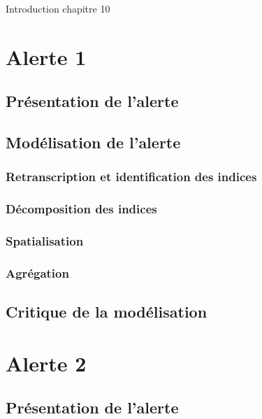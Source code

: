 \chaptertoc{}


Introduction chapitre 10

\section{Alerte 1}
\label{sec:10-1}

\subsection{Présentation de l'alerte}
\label{subsec:10-1-1}

\subsection{Modélisation de l'alerte}
\label{subsec:10-1-2}

\subsubsection{Retranscription et identification des indices}
\label{subsec:10-1-2-1}

\subsubsection{Décomposition des indices}
\label{subsec:10-1-2-2}

\subsubsection{Spatialisation}
\label{subsec:10-1-2-3}

\subsubsection{Agrégation}
\label{subsec:10-1-2-4}


\subsection{Critique de la modélisation}
\label{subsec:10-1-3}

\section{Alerte 2}
\label{sec:10-2}

\subsection{Présentation de l'alerte}
\label{subsec:10-2-1}

